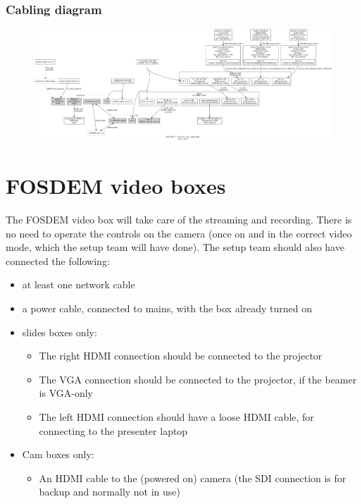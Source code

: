 \documentclass{article}
\begin{document}
\subsubsection{Cabling diagram}
\begin{figure}[H]
  \begin{sideways}
  \centering
  \includegraphics[width = 200mm]{../../graph/cabling_xxl_rooms.png}
  \end{sideways}
\end{figure}

\section{FOSDEM video boxes}
The FOSDEM video box will take care of the streaming and recording.
There is no need to operate the controls on the camera (once on and in the correct video mode, which the setup team will have done). The setup team should also have connected the following:
\begin{itemize}
  \item at least one network cable
  \item a power cable, connected to mains, with the box already turned on
  \item slides boxes only:
    \begin{itemize}
      \item The right HDMI connection should be connected to the projector
      \item The VGA connection should be connected to the projector, if the beamer is VGA-only
      \item The left HDMI connection should have a loose HDMI cable, for connecting to the presenter laptop
    \end{itemize}
  \item Cam boxes only:
    \begin{itemize}
      \item An HDMI cable to the (powered on) camera (the SDI connection is for backup and normally not in use)
    \end{itemize}
\end{itemize}
\end{document}
